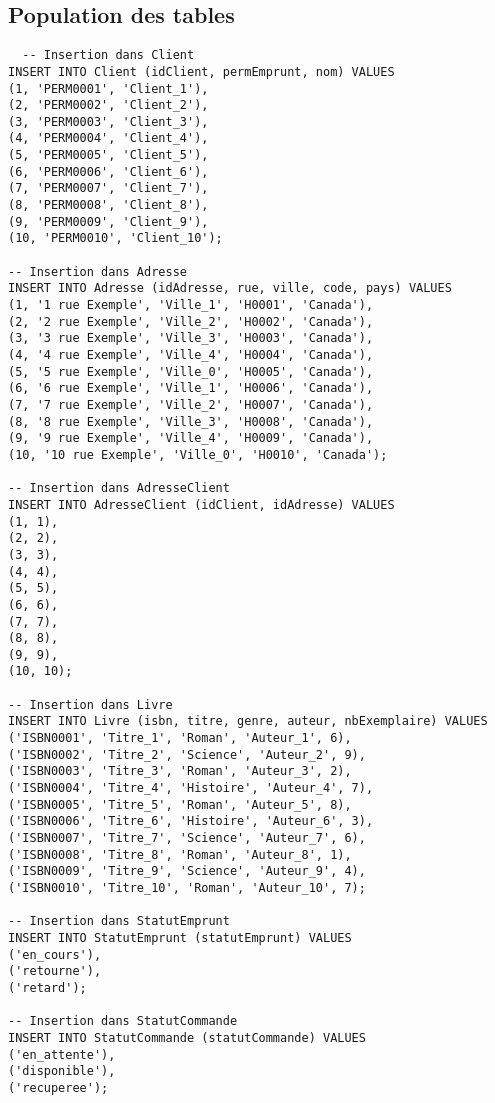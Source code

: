 \documentclass{article}
\begin{document}
\subsection{Population des tables}
\begin{lstlisting}
  -- Insertion dans Client
INSERT INTO Client (idClient, permEmprunt, nom) VALUES
(1, 'PERM0001', 'Client_1'),
(2, 'PERM0002', 'Client_2'),
(3, 'PERM0003', 'Client_3'),
(4, 'PERM0004', 'Client_4'),
(5, 'PERM0005', 'Client_5'),
(6, 'PERM0006', 'Client_6'),
(7, 'PERM0007', 'Client_7'),
(8, 'PERM0008', 'Client_8'),
(9, 'PERM0009', 'Client_9'),
(10, 'PERM0010', 'Client_10');

-- Insertion dans Adresse
INSERT INTO Adresse (idAdresse, rue, ville, code, pays) VALUES
(1, '1 rue Exemple', 'Ville_1', 'H0001', 'Canada'),
(2, '2 rue Exemple', 'Ville_2', 'H0002', 'Canada'),
(3, '3 rue Exemple', 'Ville_3', 'H0003', 'Canada'),
(4, '4 rue Exemple', 'Ville_4', 'H0004', 'Canada'),
(5, '5 rue Exemple', 'Ville_0', 'H0005', 'Canada'),
(6, '6 rue Exemple', 'Ville_1', 'H0006', 'Canada'),
(7, '7 rue Exemple', 'Ville_2', 'H0007', 'Canada'),
(8, '8 rue Exemple', 'Ville_3', 'H0008', 'Canada'),
(9, '9 rue Exemple', 'Ville_4', 'H0009', 'Canada'),
(10, '10 rue Exemple', 'Ville_0', 'H0010', 'Canada');

-- Insertion dans AdresseClient
INSERT INTO AdresseClient (idClient, idAdresse) VALUES
(1, 1),
(2, 2),
(3, 3),
(4, 4),
(5, 5),
(6, 6),
(7, 7),
(8, 8),
(9, 9),
(10, 10);

-- Insertion dans Livre
INSERT INTO Livre (isbn, titre, genre, auteur, nbExemplaire) VALUES
('ISBN0001', 'Titre_1', 'Roman', 'Auteur_1', 6),
('ISBN0002', 'Titre_2', 'Science', 'Auteur_2', 9),
('ISBN0003', 'Titre_3', 'Roman', 'Auteur_3', 2),
('ISBN0004', 'Titre_4', 'Histoire', 'Auteur_4', 7),
('ISBN0005', 'Titre_5', 'Roman', 'Auteur_5', 8),
('ISBN0006', 'Titre_6', 'Histoire', 'Auteur_6', 3),
('ISBN0007', 'Titre_7', 'Science', 'Auteur_7', 6),
('ISBN0008', 'Titre_8', 'Roman', 'Auteur_8', 1),
('ISBN0009', 'Titre_9', 'Science', 'Auteur_9', 4),
('ISBN0010', 'Titre_10', 'Roman', 'Auteur_10', 7);

-- Insertion dans StatutEmprunt
INSERT INTO StatutEmprunt (statutEmprunt) VALUES
('en_cours'),
('retourne'),
('retard');

-- Insertion dans StatutCommande
INSERT INTO StatutCommande (statutCommande) VALUES
('en_attente'),
('disponible'),
('recuperee');


\end{lstlisting}
\end{document}
